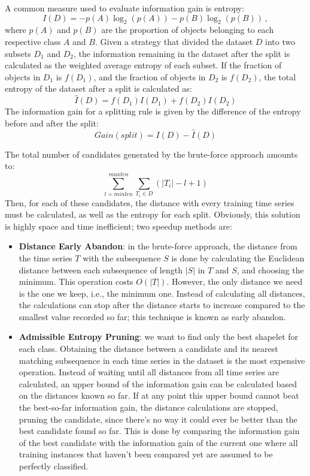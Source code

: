 A common measure used to evaluate information gain is entropy:
\begin{equation*}
    I(D) = -p(A) \log_2 (p(A)) -p(B) \log_2 (p(B)) \,,
\end{equation*}
where $p(A)$ and $p(B)$ are the proportion of objects belonging to each respective class $A$ and $B$. Given a strategy that divided the dataset $D$ into two subsets $D_1$ and $D_2$, the information remaining in the dataset after the split is calculated as the weighted average entropy of each subset.
If the fraction of objects in $D_1$ is $f(D_1)$, and the fraction of objects in $D_2$ is $f(D_2)$, the total entropy of the dataset after a split is calculated as:
\begin{equation*}
    \hat{I}(D) = f(D_1)I(D_1) + f(D_2)I(D_2)
\end{equation*}
The information gain for a splitting rule is given by the difference of the entropy before and after the split:
\begin{equation*}
    Gain(split) = I(D) - \hat{I}(D)
\end{equation*}

The total number of candidates generated by the brute-force approach amounts to:
\begin{equation*}
    \sum_{l = minlen}^{maxlen} \sum_{T_i \in D}(|T_i| - l + 1)
\end{equation*}
Then, for each of these candidates, the distance with every training time series must be calculated, as well as the entropy for each split. Obviously, this solution is highly space and time inefficient; two speedup methods are:
\begin{itemize}
    \item \textbf{Distance Early Abandon}: in the brute-force approach, the distance from the time series $T$ with the subsequence $S$ is done by calculating the Euclidean distance between each subsequence of length $|S|$ in $T$ and $S$, and choosing the minimum. This operation costs $O(|T|)$. However, the only distance we need is the one we keep, i.e., the minimum one. Instead of calculating all distances, the calculations can stop after the distance starts to increase compared to the smallest value recorded so far; this technique is known as early abandon.

    \item \textbf{Admissible Entropy Pruning}: we want to find only the best shapelet for each class. Obtaining the distance between a candidate and its nearest matching subsequence in each time series in the dataset is the most expensive operation. Instead of waiting until all distances from all time series are calculated, an upper bound of the information gain can be calculated based on the distances known so far. If at any point this upper bound cannot beat the best-so-far information gain, the distance calculations are stopped, pruning the candidate, since there's no way it could ever be better than the best candidate found so far. This is done by comparing the information gain of the best candidate with the information gain of the current one where all training instances that haven't been compared yet are assumed to be perfectly classified. 
\end{itemize}



